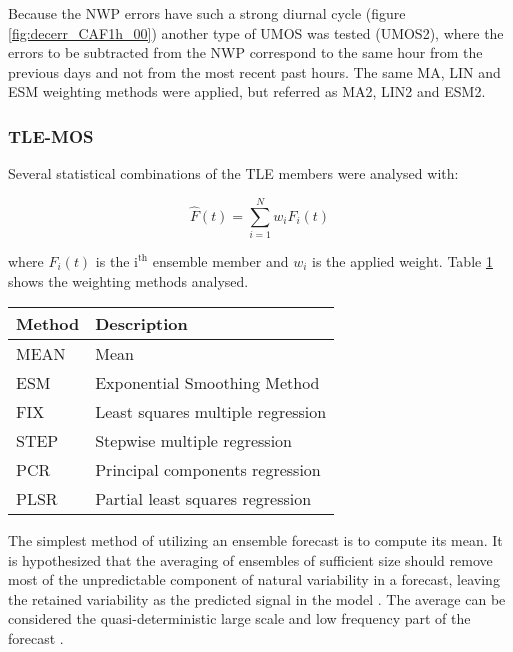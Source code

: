Because the NWP errors have such a strong diurnal cycle (figure \ref{fig:decerr_CAF1h_00}) another type of UMOS was tested (UMOS2), where the errors to be subtracted from the NWP correspond to the same hour from the previous days and not from the most recent past hours. The same MA, LIN and ESM weighting methods were applied, but referred as MA2, LIN2 and ESM2.

\subsubsection{TLE-MOS}

Several statistical combinations of the TLE members were analysed with:

\begin{equation}
    \hat{F}(t) = \sum_{i=1}^N w_i F_i(t)
    \label{eq:ens}
\end{equation}

where $F_i(t)$ is the $\mathrm{i^{th}}$ ensemble member and $w_i$ is the applied weight. Table \ref{tb:tle_methods} shows the weighting methods analysed.

\begin{table}[!htp]
    \small
    \centering
    \label{tb:tle_methods}
    \begin{tabular}{ll}
        \toprule
        Method & Description \\
        \midrule
        MEAN     & Mean \\
        ESM     & Exponential Smoothing Method \\
        FIX     & Least squares multiple regression \\
        STEP     & Stepwise multiple regression \\
        PCR     & Principal components regression \\
        PLSR     & Partial least squares regression \\
        \bottomrule
    \end{tabular}
\end{table}
\FloatBarrier

The simplest method of utilizing an ensemble forecast is to compute its mean.  It is hypothesized that the averaging of ensembles of sufficient size should remove most of the unpredictable component of natural variability in a forecast, leaving the retained variability as the predicted signal in the model \citep{MoStraus2002}. The average can be considered the quasi-deterministic large scale and low frequency part of the forecast \citep{vandenDoolRukhovets1994}.

